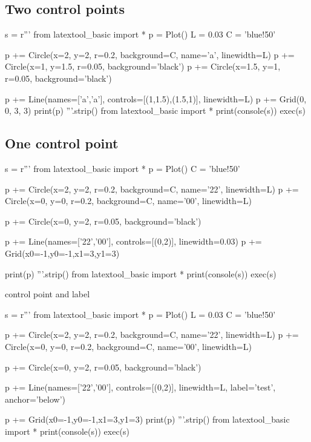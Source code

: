 \newpage
\subsection{Two control points}

\begin{python}
s = r'''
from latextool_basic import *
p = Plot()
L = 0.03
C = 'blue!50'

p += Circle(x=2, y=2, r=0.2, background=C, name='a', linewidth=L)
p += Circle(x=1, y=1.5, r=0.05, background='black')
p += Circle(x=1.5, y=1, r=0.05, background='black')

p += Line(names=['a','a'], controls=[(1,1.5),(1.5,1)], linewidth=L)
p += Grid(0, 0, 3, 3)
print(p)
'''.strip()
from latextool_basic import *
print(console(s))
exec(s)
\end{python}


\newpage
\subsection{One control point}

\begin{python}
s = r'''
from latextool_basic import *
p = Plot()
C = 'blue!50'

p += Circle(x=2, y=2, r=0.2, background=C, name='22', linewidth=L)
p += Circle(x=0, y=0, r=0.2, background=C, name='00', linewidth=L)

p += Circle(x=0, y=2, r=0.05, background='black')

p += Line(names=['22','00'], controls=[(0,2)], linewidth=0.03)
p += Grid(x0=-1,y0=-1,x1=3,y1=3)

print(p)
'''.strip()
from latextool_basic import *
print(console(s))
exec(s)
\end{python}



 control point and label
\begin{python}
s = r'''
from latextool_basic import *
p = Plot()
L = 0.03
C = 'blue!50'

p += Circle(x=2, y=2, r=0.2, background=C, name='22', linewidth=L)
p += Circle(x=0, y=0, r=0.2, background=C, name='00', linewidth=L)

p += Circle(x=0, y=2, r=0.05, background='black')

p += Line(names=['22','00'], controls=[(0,2)], linewidth=L, label='test', anchor='below')

p += Grid(x0=-1,y0=-1,x1=3,y1=3)
print(p)
'''.strip()
from latextool_basic import *
print(console(s))
exec(s)
\end{python}



